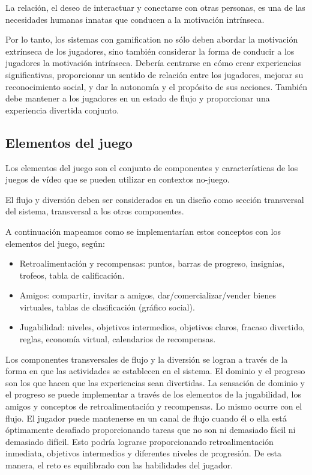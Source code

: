 La relación, el deseo de interactuar y conectarse con otras personas, es una de
las necesidades humanas innatas que conducen a la motivación
intrínseca\cite{framework:gamification}.

Por lo tanto, los sistemas con gamification no sólo deben abordar la motivación
extrínseca de los jugadores, sino también considerar la forma de conducir a los
jugadores la motivación intrínseca. Debería centrarse en cómo crear experiencias
significativas, proporcionar un sentido de relación entre los jugadores, mejorar
su reconocimiento social, y dar la autonomía y el propósito de sus acciones.
También debe mantener a los jugadores en un estado de flujo y proporcionar una
experiencia divertida conjunto\cite{framework:gamification}. 


\subsection{Elementos del juego}

Los elementos del juego son el conjunto de componentes y características de los
juegos de vídeo que se pueden utilizar en contextos
no-juego\cite{framework:gamification}.

El flujo y diversión deben ser considerados en un diseño como sección
transversal del sistema, transversal a los otros
componentes\cite{framework:gamification}.

A continuación mapeamos como se implementarían estos conceptos con los elementos
del juego, según\cite{framework:gamification}:

\begin{itemize}
    \item Retroalimentación y recompensas: puntos, barras de progreso,
        insignias, trofeos, tabla de calificación.
    \item Amigos: compartir, invitar a amigos, dar/comercializar/vender bienes
        virtuales, tablas de clasificación (gráfico social).
    \item Jugabilidad: niveles, objetivos intermedios, objetivos claros, fracaso
        divertido, reglas, economía virtual, calendarios de recompensas.
\end{itemize}

Los componentes transversales de flujo y la diversión se logran a través de la
forma en que las actividades se establecen en el sistema. El dominio y el
progreso son los que hacen que las experiencias sean divertidas. La sensación de
dominio y el progreso se puede implementar a través de los elementos de la
jugabilidad, los amigos y conceptos de retroalimentación y recompensas. Lo mismo
ocurre con el flujo. El jugador puede mantenerse en un canal de flujo cuando él
o ella está óptimamente desafiado proporcionando tareas que no son ni demasiado
fácil ni demasiado difícil. Esto podría lograrse proporcionando
retroalimentación inmediata, objetivos intermedios y diferentes niveles de
progresión. De esta manera, el reto es equilibrado con las habilidades del
jugador\cite{framework:gamification}.
